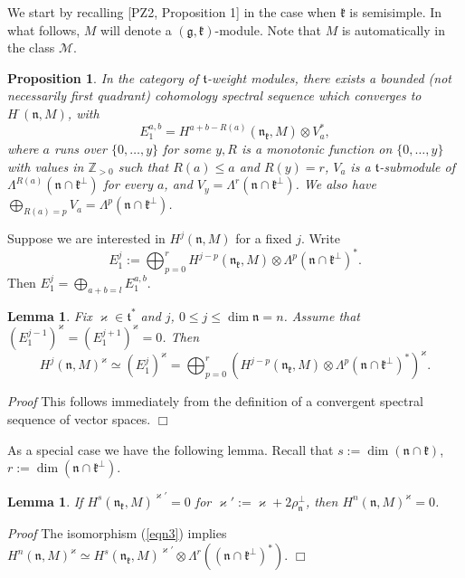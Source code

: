 \documentclass[11pt]{amsart}
\newcounter{theorem}
\newtheorem{lemma}[theo]{Lemma}
\newtheorem{prop}[theo]{Proposition}
\renewenvironment{proof}{ \emph{Proof}}{$\Box$}
\newcommand {\ZZ} {\mathbb {Z}}
\renewcommand{\tt}{\mathfrak{t}}
\newcommand{\kk}{\mathfrak{k}}
\newcommand{\nn}{\mathfrak{n}}
\renewcommand{\gg}{\mathfrak{g}}
\newcommand{\refeq}[1]{(\ref{#1})}
\begin{document}
We start by recalling [PZ2, Proposition 1]  in the case when $\kk$ is semisimple. In what follows, $M$ will denote a $(\gg,\kk)$-module. Note that $M$ is automatically in the class $\mathcal{M}$.
\begin{prop}
In the category of $\tt$-weight modules, there exists a bounded (not necessarily first quadrant) cohomology spectral sequence which converges to $H^\cdot(\nn,M)$, with 
\[
E_1^{a,b}=H^{a+b-R(a)}(\nn_\kk,M)\otimes V_a^*,
\]
where $a$ runs over $\{0,\dots,y\}$ for some $y, R$ is a monotonic function on $\{0,\dots,y\}$ with values in $\ZZ_{>0}$ such that $R(a)\leq a$ and $R(y)=r$, $V_a$ is a $\tt$-submodule of $\Lambda^{R(a)}(\nn\cap\kk^\perp)$ for every $a$, and $V_y=\Lambda^r(\nn\cap\kk^\perp)$. We also have $\bigoplus_{R(a)=p}V_a=\Lambda^p(\nn\cap\kk^\perp)$. 
\end{prop}
Suppose we are interested in $H^j(\nn,M)$ for a fixed $j$. Write 
\[
E_1^j:=\bigoplus_{p=0}^r H^{j-p}(\nn_\kk,M)\otimes\Lambda^p(\nn\cap\kk^\perp)^*.
\]
Then $E_1^j=\bigoplus_{a+b=l}E_1^{a,b}$.

\begin{lemma} \label{le1}
Fix $\varkappa \in \tt^*$ and $j$, $0\leq j\leq\dim\nn=n$. Assume that $(E_1^{j-1})^{\varkappa}=(E_1^{j+1})^{\varkappa}=0$. Then 
\begin{equation}\label{eqn3}
H^j(\nn,M)^\varkappa\simeq (E_1^j)^\varkappa=\bigoplus_{p=0}^r\left(H^{j-p}(\nn_\kk,M)\otimes \Lambda^p(\nn\cap\kk^\perp)^*\right)^\varkappa.
\end{equation}
\end{lemma}
\begin{proof}
This follows immediately from the definition of a convergent spectral sequence of vector spaces. 
\end{proof}

As a special case we have the following lemma. Recall that $s:=\dim(\nn\cap\kk)$, $r:=\dim(\nn\cap\kk^\perp)$.
\begin{lemma}\label{le3.5}
If $H^s(\nn_\kk,M)^{\varkappa'}=0$ for $\varkappa':=\varkappa+2\rho_\nn^\perp$, then $H^n(\nn,M)^\varkappa=0$.
\end{lemma}
\begin{proof}
The isomorphism \refeq{eqn3} implies $H^n(\nn,M)^\varkappa\simeq H^s(\nn_\kk,M)^{\varkappa '}\otimes\Lambda^r((\nn\cap\kk^\perp)^*)$.
\end{proof}
\end{document}
